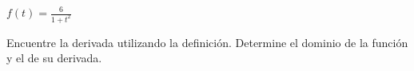 \item $f(t) = \frac{6}{1 + t^2}$
\par
Encuentre la derivada utilizando la definición. Determine el dominio de la función y el de su derivada.
